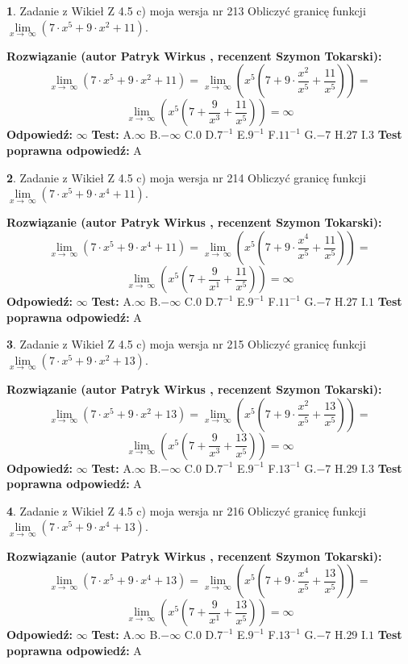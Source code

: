 \documentclass[12pt, a4paper]{article}
\theoremstyle{definition} %
\newtheorem{zad}{}
\newcommand{\zadStart}[1]{\begin{zad}#1\newline}
\newcommand{\zadStop}{\end{zad}}
\newcommand{\rozwStart}[2]{\noindent \textbf{Rozwiązanie (autor #1 , recenzent #2): }\newline}
\newcommand{\rozwStop}{\newline}
\newcommand{\odpStart}{\noindent \textbf{Odpowiedź:}\newline}
\newcommand{\odpStop}{\newline}
\newcommand{\testStart}{\noindent \textbf{Test:}\newline}
\newcommand{\testStop}{\newline}
\newcommand{\kluczStart}{\noindent \textbf{Test poprawna odpowiedź:}\newline}
\newcommand{\kluczStop}{\newline}
\begin{document}
\zadStart{Zadanie z Wikieł Z 4.5 c) moja wersja nr 213}
Obliczyć granicę funkcji  $\lim\limits_{x\to\ \infty}(7 \cdot x^{5}+9 \cdot x^{2}+11)$.
\zadStop
\rozwStart{Patryk Wirkus}{Szymon Tokarski}
$$\lim\limits_{x\to\ \infty}(7 \cdot x^{5}+9 \cdot x^{2}+11) = \lim\limits_{x\to\ \infty}(x^{5}(7 +9 \cdot \frac{x^{2}}{x^{5}}+\frac{11}{x^{5}})) =$$ $$\lim\limits_{x\to\ \infty}(x^{5}(7 +\frac{9}{x^{3}}+\frac{11}{x^{5}})) =\infty$$
\rozwStop
\odpStart
$\infty$
\odpStop
\testStart
A.$\infty$ B.$-\infty$ C.$0$ D.$7^{-1}$ E.$9^{-1}$
F.$11^{-1}$ G.$-7$
H.$27$
I.$3$
\testStop
\kluczStart
A
\kluczStop



\zadStart{Zadanie z Wikieł Z 4.5 c) moja wersja nr 214}
Obliczyć granicę funkcji  $\lim\limits_{x\to\ \infty}(7 \cdot x^{5}+9 \cdot x^{4}+11)$.
\zadStop
\rozwStart{Patryk Wirkus}{Szymon Tokarski}
$$\lim\limits_{x\to\ \infty}(7 \cdot x^{5}+9 \cdot x^{4}+11) = \lim\limits_{x\to\ \infty}(x^{5}(7 +9 \cdot \frac{x^{4}}{x^{5}}+\frac{11}{x^{5}})) =$$ $$\lim\limits_{x\to\ \infty}(x^{5}(7 +\frac{9}{x^{1}}+\frac{11}{x^{5}})) =\infty$$
\rozwStop
\odpStart
$\infty$
\odpStop
\testStart
A.$\infty$ B.$-\infty$ C.$0$ D.$7^{-1}$ E.$9^{-1}$
F.$11^{-1}$ G.$-7$
H.$27$
I.$1$
\testStop
\kluczStart
A
\kluczStop



\zadStart{Zadanie z Wikieł Z 4.5 c) moja wersja nr 215}
Obliczyć granicę funkcji  $\lim\limits_{x\to\ \infty}(7 \cdot x^{5}+9 \cdot x^{2}+13)$.
\zadStop
\rozwStart{Patryk Wirkus}{Szymon Tokarski}
$$\lim\limits_{x\to\ \infty}(7 \cdot x^{5}+9 \cdot x^{2}+13) = \lim\limits_{x\to\ \infty}(x^{5}(7 +9 \cdot \frac{x^{2}}{x^{5}}+\frac{13}{x^{5}})) =$$ $$\lim\limits_{x\to\ \infty}(x^{5}(7 +\frac{9}{x^{3}}+\frac{13}{x^{5}})) =\infty$$
\rozwStop
\odpStart
$\infty$
\odpStop
\testStart
A.$\infty$ B.$-\infty$ C.$0$ D.$7^{-1}$ E.$9^{-1}$
F.$13^{-1}$ G.$-7$
H.$29$
I.$3$
\testStop
\kluczStart
A
\kluczStop



\zadStart{Zadanie z Wikieł Z 4.5 c) moja wersja nr 216}
Obliczyć granicę funkcji  $\lim\limits_{x\to\ \infty}(7 \cdot x^{5}+9 \cdot x^{4}+13)$.
\zadStop
\rozwStart{Patryk Wirkus}{Szymon Tokarski}
$$\lim\limits_{x\to\ \infty}(7 \cdot x^{5}+9 \cdot x^{4}+13) = \lim\limits_{x\to\ \infty}(x^{5}(7 +9 \cdot \frac{x^{4}}{x^{5}}+\frac{13}{x^{5}})) =$$ $$\lim\limits_{x\to\ \infty}(x^{5}(7 +\frac{9}{x^{1}}+\frac{13}{x^{5}})) =\infty$$
\rozwStop
\odpStart
$\infty$
\odpStop
\testStart
A.$\infty$ B.$-\infty$ C.$0$ D.$7^{-1}$ E.$9^{-1}$
F.$13^{-1}$ G.$-7$
H.$29$
I.$1$
\testStop
\kluczStart
A
\kluczStop
\end{document}
